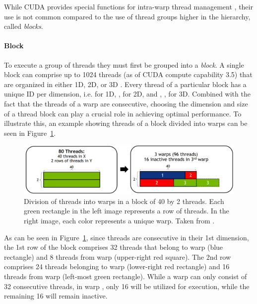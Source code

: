 While CUDA provides special functions for intra-warp thread management \cite{Grover15January2018}, their use is not common compared to the use of thread groups higher in the hierarchy, called \textit{blocks}.

\paragraph{Block} To execute a group of threads they must first be grouped into a \textit{block}.
A single block can comprise up to 1024 threads (as of CUDA compute capability 3.5) that are organized in either 1D, 2D, or 3D \cite{NVIDIADecember2022}.
Every thread of a particular block has a unique ID per dimension, i.e.  for 1D, ,  for 2D, and , ,  for 3D.
Combined with the fact that the threads of a warp are consecutive, choosing the dimension and size of a thread block can play a crucial role in achieving optimal performance.
To illustrate this, an example showing threads of a block divided into warps can be seen in Figure~\ref{Figure:theory->CUDA->thread-management->grouping-threads-in-block-into-warps}.

\begin{figure}[ht!]
	\centering
	\includegraphics[width=\textwidth, keepaspectratio]{images/ch01/CUDA_threads_in_warp_and_block.png}
	\caption{Division of threads into warps in a block of 40 by 2 threads.
		Each green rectangle in the left image represents a row of threads.
		In the right image, each color represents a unique warp.
		Taken from  \cite{ThomasCollignon2018}.
	}
	\label{Figure:theory->CUDA->thread-management->grouping-threads-in-block-into-warps}
\end{figure}

As can be seen in Figure~\ref{Figure:theory->CUDA->thread-management->grouping-threads-in-block-into-warps}, since threads are consecutive in their 1st dimension, the 1st row of the block comprises 32 threads that belong to warp  (blue rectangle) and 8 threads from warp  (upper-right red square).
The 2nd row comprises 24 threads belonging to warp  (lower-right red rectangle) and 16 threads from warp  (left-most green rectangle).
While a warp can only consist of 32 consecutive threads, in warp , only 16 will be utilized for execution, while the remaining 16 will remain inactive.

